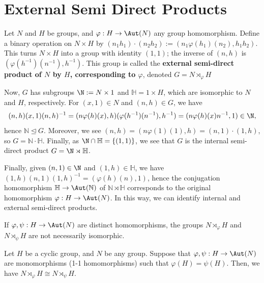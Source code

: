 \section{External Semi Direct Products}

\begin{defn}
    Let $N$ and $H$ be groups, and $\varphi :H \to \Aut (N)$ any group homomorphism. Define a binary operation on $N \times H$ by $(n_1h_1)\cdot (n_2h_2) := (n_1\varphi(h_1)(n_2),h_1h_2)$. This turns $N \times H$ into a group with identity $(1,1)$; the inverse of $(n,h)$ is $(\varphi(h^{-1})(n^{-1}),h^{-1})$. This group is called the \textbf{external semi-direct product of $N$ by $H$, corresponding to $\varphi$}, denoted $G = N \rtimes _\varphi H$
\end{defn}

Now, $G$ has subgroups $\N := N \times 1$ and $\mathbb H = 1 \times H$, which are isomorphic to $N$ and $H$, respectively. For $(x,1) \in N$ and $(n,h) \in G$, we have
$$(n,h)(x,1)(n,h)^{-1}=(n\varphi(h)(x),h)(\varphi(h^{-1})(n^{-1}),h^{-1})=(n\varphi (h)(x) n^{-1},1) \in \N,$$
hence $\mathbb N \unlhd G$. Moreover, we see $(n,h) = (n\varphi(1)(1),h)=(n,1)\cdot (1,h)$, so $G = \mathbb N \cdot \mathbb H$. Finally, as $\N \cap \mathbb H = \{(1,1)\}$, we see that $G$ is the internal semi-direct product $G = \N \rtimes \mathbb H$.

Finally, given $(n,1) \in \N$ and $(1,h) \in \mathbb H$, we have $(1,h)(n,1)(1,h)^{-1}=(\varphi(h)(n),1)$, hence the conjugation homomorphism $\mathbb H \to \Aut (\mathbb N)$ of $\mathbb N \rtimes \mathbb H$ corresponds to the original homomorphism $\varphi :H \to \Aut (N)$. In this way, we can identify internal and external semi-direct products.

\begin{rmk}
    If $\varphi, \psi:H \to \Aut(N)$ are distinct homomorphisms, the groups $N \rtimes _\varphi H$ and $N \rtimes _\psi H$ are not necessarily isomorphic.
\end{rmk}

\begin{lem}[][label=lem:semidirect-iso]
    Let $H$ be a cyclic group, and $N$ be any group. Suppose that $\varphi ,\psi :H \to \Aut(N)$ are monomorphisms (1-1 homomorphisms) such that $\varphi (H) = \psi (H)$. Then, we have $N \rtimes _\varphi H \cong N \rtimes _\psi H$.
\end{lem}

